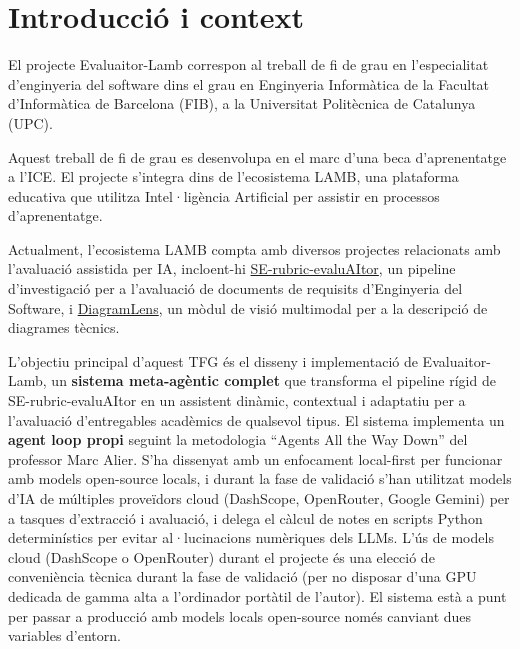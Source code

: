 \documentclass[12pt,a4paper,twoside]{report}
\begin{document}
\listoftables
{}
\newpage

\chapter{Introducci\'o i context}
\label{chap:introduccio}

El projecte Evaluaitor-Lamb correspon al treball de fi de grau en l'especialitat d'enginyeria del software dins el grau en Enginyeria Inform\`atica de la Facultat d'Inform\`atica de Barcelona (FIB), a la Universitat Polit\`ecnica de Catalunya (UPC).

Aquest treball de fi de grau es desenvolupa en el marc d'una beca d'aprenentatge a l'ICE. El projecte s'integra dins de l'ecosistema LAMB, una plataforma educativa que utilitza Intel·lig\`encia Artificial per assistir en processos d'aprenentatge.

Actualment, l'ecosistema LAMB compta amb diversos projectes relacionats amb l'avaluaci\'o assistida per IA, incloent-hi \href{https://github.com/Lamb-Project/SE-rubric-evaluAItor}{SE-rubric-evaluAItor}, un pipeline d'investigaci\'o per a l'avaluaci\'o de documents de requisits d'Enginyeria del Software, i \href{https://github.com/Lamb-Project/DiagramLens}{DiagramLens}, un m\`odul de visi\'o multimodal per a la descripci\'o de diagrames t\`ecnics.

L'objectiu principal d'aquest TFG \'es el disseny i implementaci\'o de Evaluaitor-Lamb, un \textbf{sistema meta-ag\`entic complet} que transforma el pipeline r\'igid de SE-rubric-evaluAItor en un assistent din\`amic, contextual i adaptatiu per a l'avaluaci\'o d'entregables acad\`emics de qualsevol tipus. El sistema implementa un \textbf{agent loop propi} seguint la metodologia ``Agents All the Way Down'' del professor Marc Alier. S’ha dissenyat amb un enfocament local-first per funcionar amb models open-source locals, i durant la fase de validació s’han utilitzat models d'IA de m\'ultiples prove\"idors cloud (DashScope, OpenRouter, Google Gemini) per a tasques d'extracci\'o i avaluaci\'o, i delega el c\`alcul de notes en scripts Python determin\'istics per evitar al·lucinacions num\`eriques dels LLMs. L'\'us de models cloud (DashScope o OpenRouter) durant el projecte \'es una elecci\'o de conveni\`encia t\`ecnica durant la fase de validaci\'o (per no disposar d'una GPU dedicada de gamma alta a l'ordinador port\`atil de l'autor). El sistema est\`a a punt per passar a producci\'o amb models locals open-source nom\'es canviant dues variables d'entorn.
\end{document}
